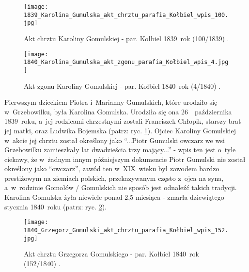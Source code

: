 \begin{figure}[!ht]
    \vspace*{0.5cm}
    \centering \texttt{[image: 
        1839\_Karolina\_Gumulska\_akt\_chrztu\_parafia\_Kołbiel\_wpis\_100.jpg]}
    \captionsetup{format=hang}
    \caption{Akt chrztu Karoliny Gomulskiej - par. Kołbiel 1839~rok (100/1839) 
    \cite{par_kolbiel2}.}
    \label{fig:kgomulska_1839}
\end{figure}

\begin{figure}[!ht]
    \vspace*{0.5cm}
    \centering \texttt{[image: 
        1840\_Karolina\_Gumulska\_akt\_zgonu\_parafia\_Kołbiel\_wpis\_4.jpg]}
    \captionsetup{format=hang}
    \caption{Akt zgonu Karoliny Gomulskiej - par. Kołbiel 1840~rok (4/1840) 
    \cite{par_kolbiel2}.}
    \label{fig:kgomulska_1840}
\end{figure}

Pierwszym dzieckiem Piotra i~Marianny Gumulskich, które urodziło się 
w~Grzebowilku, była Karolina Gomulska. Urodziła się ona 26~~października 
1839~roku, a~jej rodzicami chrzestnymi zostali Franciszek Chłopik, starszy 
brat jej matki, oraz Ludwika Bojemska (patrz: ryc. \ref{fig:kgomulska_1839}). 
Ojciec Karoliny Gomulskiej w~akcie jej chrztu został określony jako 
\enquote{...Piotr Gumulski owczarz we wsi Grzebowilku zamieszkały lat 
dwadzieścia trzy mający...} - wpis ten jest o~tyle ciekawy, że w~żadnym 
innym późniejszym dokumencie Piotr Gumulski nie został określony jako 
\enquote{owczarz}, zawód ten w~XIX~wieku był zawodem bardzo prestiżowym na 
ziemiach polskich, przekazywanym często z~ojca na syna, a~w~rodzinie 
Gomołów / Gomulskich nie sposób jest odnaleźć takich tradycji. Karolina 
Gomulska żyła niewiele ponad 2,5 miesiąca - zmarła dziewiątego stycznia 
1840~roku (patrz: ryc. \ref{fig:kgomulska_1840}).

\begin{figure}[!ht]
    \vspace*{0.5cm}
    \centering \texttt{[image: 
        1840\_Grzegorz\_Gomulski\_akt\_chrztu\_parafia\_Kołbiel\_wpis\_152.jpg]}
    \captionsetup{format=hang}
    \caption{Akt chrztu Grzegorza Gomulskiego - par. Kołbiel 1840~rok 
    (152/1840) \cite{par_kolbiel2}.}
    \label{fig:ggomulski_1840}
\end{figure}


